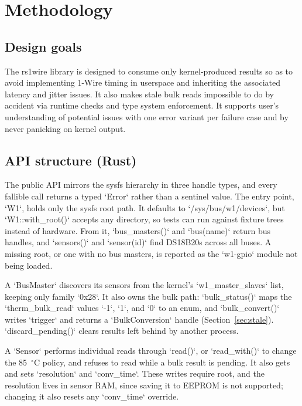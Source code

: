 \documentclass[conference]{IEEEtran}
\begin{document}
\section{Methodology}


\subsection{Design goals}

The rs1wire library is designed to consume only kernel-produced results so as to avoid implementing 1-Wire timing in userspace and inheriting the associated latency and jitter issues.
It also makes stale bulk reads impossible to do by accident via runtime checks and type system enforcement.
It supports user's understanding of potential issues with one error variant per failure case and by never panicking on kernel output.

\subsection{API structure (Rust)}

The public API mirrors the sysfs hierarchy in three handle types, and every fallible call returns a typed `Error` rather than a sentinel value.
The entry point, `W1`, holds only the sysfs root path.
It defaults to `/sys/bus/w1/devices`, but `W1::with\_root()` accepts any directory, so tests can run against fixture trees instead of hardware.
From it, `bus\_masters()` and `bus(name)` return bus handles, and `sensors()` and `sensor(id)` find DS18B20s across all buses.
A missing root, or one with no bus masters, is reported as the `w1-gpio` module not being loaded.

A `BusMaster` discovers its sensors from the kernel's `w1\_master\_slaves` list, keeping only family `0x28`.
It also owns the bulk path: `bulk\_status()` maps the `therm\_bulk\_read` values `-1`, `1`, and `0` to an enum, and `bulk\_convert()` writes `trigger` and returns a `BulkConversion` handle (Section~\ref{sec:stale}).
`discard\_pending()` clears results left behind by another process.

A `Sensor` performs individual reads through `read()`, or `read\_with()` to change the 85~$^\circ$C policy, and refuses to read while a bulk result is pending.
It also gets and sets `resolution` and `conv\_time`.
These writes require root, and the resolution lives in sensor RAM, since saving it to EEPROM is not supported; changing it also resets any `conv\_time` override.
\end{document}
